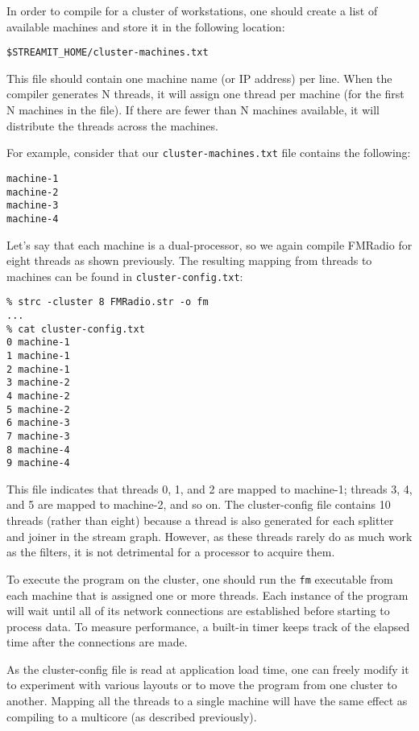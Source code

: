 In order to compile for a cluster of workstations, one should create a
list of available machines and store it in the following location:
\begin{verbatim}
$STREAMIT_HOME/cluster-machines.txt
\end{verbatim}
This file should contain one machine name (or IP address) per line.
When the compiler generates N threads, it will assign one thread per
machine (for the first N machines in the file).  If there are fewer
than N machines available, it will distribute the threads across the
machines.

For example, consider that our {\tt cluster-machines.txt} file
contains the following:
{\small
\begin{verbatim}
machine-1
machine-2
machine-3
machine-4
\end{verbatim}}

Let's say that each machine is a dual-processor, so we again compile
FMRadio for eight threads as shown previously.  The resulting mapping
from threads to machines can be found in {\tt cluster-config.txt}:
{\small
\begin{verbatim}
% strc -cluster 8 FMRadio.str -o fm
...
% cat cluster-config.txt
0 machine-1
1 machine-1
2 machine-1
3 machine-2
4 machine-2
5 machine-2
6 machine-3
7 machine-3
8 machine-4
9 machine-4
\end{verbatim}}

This file indicates that threads 0, 1, and 2 are mapped to machine-1;
threads 3, 4, and 5 are mapped to machine-2, and so on.  The
cluster-config file contains 10 threads (rather than eight) because a
thread is also generated for each splitter and joiner in the stream
graph.  However, as these threads rarely do as much work as the
filters, it is not detrimental for a processor to acquire them.

To execute the program on the cluster, one should run the {\tt fm}
executable from each machine that is assigned one or more threads.
Each instance of the program will wait until all of its network
connections are established before starting to process data.  To
measure performance, a built-in timer keeps track of the elapsed time
after the connections are made.

As the cluster-config file is read at application load time, one can
freely modify it to experiment with various layouts or to move the
program from one cluster to another.  Mapping all the threads to a
single machine will have the same effect as compiling to a multicore
(as described previously).

